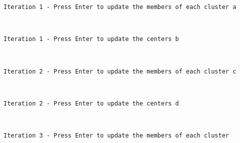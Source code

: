\documentclass[11pt]{article}
\begin{document}
    \begin{Verbatim}[commandchars=\\\{\}]
Iteration 1 - Press Enter to update the members of each cluster a
    \end{Verbatim}

    \begin{center}
    \end{center}
    { \hspace*{\fill} \\}
    
    \begin{Verbatim}[commandchars=\\\{\}]
Iteration 1 - Press Enter to update the centers b
    \end{Verbatim}

    \begin{center}
    \end{center}
    { \hspace*{\fill} \\}
    
    \begin{Verbatim}[commandchars=\\\{\}]
Iteration 2 - Press Enter to update the members of each cluster c
    \end{Verbatim}

    \begin{center}
    \end{center}
    { \hspace*{\fill} \\}
    
    \begin{Verbatim}[commandchars=\\\{\}]
Iteration 2 - Press Enter to update the centers d
    \end{Verbatim}

    \begin{center}
    \end{center}
    { \hspace*{\fill} \\}
    
    \begin{Verbatim}[commandchars=\\\{\}]
Iteration 3 - Press Enter to update the members of each cluster
    \end{Verbatim}
\end{document}
